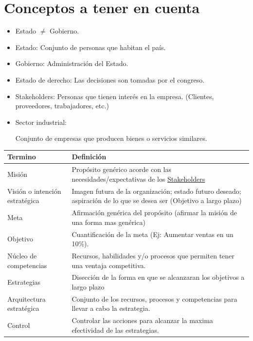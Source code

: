 \documentclass{templateNote}
\begin{document}

\portada
\margenes %
\tableofcontents
\newpage

\section{Conceptos a tener en cuenta}
\begin{itemize}
    \item Estado $\neq$ Gobierno.
    \item Estado: Conjunto de personas que habitan el país.
    \item Gobierno: Administración del Estado.
    \item Estado de derecho: Las decisiones son tomadas por el congreso. 
    \item \hypertarget{stake}{Stakeholders: Personas que tienen interés en la empresa. (Clientes, proveedores, trabajadores, etc.)}
    \item \hypertarget{sec_ind}{Sector industrial:} Conjunto de empresas que producen bienes o servicios similares.
\end{itemize}
\begin{center}
\begin{tabularx}{\textwidth}{|>{\raggedright\arraybackslash}p{3cm}|X|}
    \hline
    \textbf{Termino} & \textbf{Definición} \\
    \hline
    Misión & Propósito genérico acorde con las necesidades/expectativas de los \hyperlink{stake}{Stakeholders}\\ 
    \hline
    Visión o intención estratégica & Imagen futura de la organización; estado futuro deseado; aspiración de lo que se desea ser (Objetivo a largo plazo) \\
    \hline
    Meta & Afirmación genérica del propósito (afirmar la misión de una forma mas genérica) \\
    \hline
    Objetivo & Cuantificación de la meta (Ej: Aumentar ventas en un 10\%). \\
    \hline
    Núcleo de competencias & Recursos, habilidades y/o procesos que permiten tener una ventaja competitiva. \\
    \hline
    Estrategias & Disección de la forma en que se alcanzaran los objetivos a largo plazo \\
    \hline
    Arquitectura estratégica & Conjunto de los recursos, procesos y competencias para llevar a cabo la estrategia. \\
    \hline
    Control & Controlar las acciones para alcanzar la maxima efectividad de las estrategias. \\
    \hline
\end{tabularx}
\end{center}
\newpage
\end{document}
